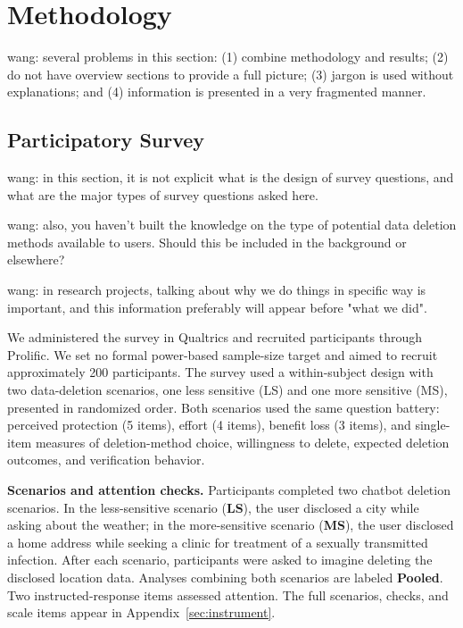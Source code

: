 \documentclass[conference,compsoc]{IEEEtran}
\newcommand{\xw}[1] {{\color{red}wang: #1}}
\begin{document}
\section{Methodology}
\label{sec:methodology}

\xw{several problems in this section: (1) combine methodology and results; (2) do not have overview sections to provide a full picture; (3) jargon is used without explanations; and (4) information is presented in a very fragmented manner. }

\subsection{Participatory Survey}
\label{sec:survey-methodology}
\xw{in this section, it is not explicit what is the design of survey questions, and what are the major types of survey questions asked here.}

\xw{also, you haven't built the knowledge on the type of potential data deletion methods available to users. Should this be included in the background or elsewhere?}

\xw{in research projects, talking about why we do things in specific way is important, and this information preferably will appear before "what we did".}

We administered the survey in Qualtrics and recruited participants through Prolific. We set no formal power-based sample-size target and aimed to recruit approximately 200 participants. The survey used a within-subject design with two data-deletion scenarios, one less sensitive (LS) and one more sensitive (MS), presented in randomized order. Both scenarios used the same question battery: perceived protection (5 items), effort (4 items), benefit loss (3 items), and single-item measures of deletion-method choice, willingness to delete, expected deletion outcomes, and verification behavior.

\textbf{Scenarios and attention checks.} Participants completed two chatbot deletion scenarios. In the less-sensitive scenario (\textbf{LS}), the user disclosed a city while asking about the weather; in the more-sensitive scenario (\textbf{MS}), the user disclosed a home address while seeking a clinic for treatment of a sexually transmitted infection. After each scenario, participants were asked to imagine deleting the disclosed location data. Analyses combining both scenarios are labeled \textbf{Pooled}. Two instructed-response items assessed attention. The full scenarios, checks, and scale items appear in Appendix~\ref{sec:instrument}.
\end{document}
